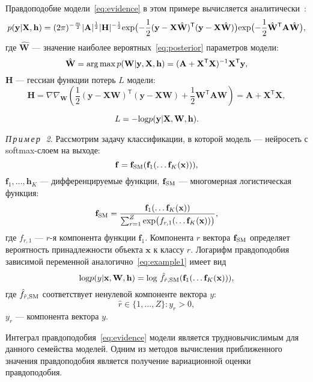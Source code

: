 Правдоподобие модели~\eqref{eq:evidence} в этом примере вычисляется аналитически~\cite{hyperopt}:
\begin{equation}
\label{eq:ground}
	p(\mathbf{y}|\mathbf{X},\mathbf{h})  =  (2\pi) ^{-\frac{m}{2}} |\mathbf{A}|^{\frac{1}{2}} |\mathbf{H}|^{-\frac{1}{2}}  \textnormal{exp}\bigl(-\frac{1}{2}(\mathbf{y} -\mathbf{X} \hat{\mathbf{W}})^\mathsf{T}(\mathbf{y} - \mathbf{X}\hat{\mathbf{W}})\bigr)\textnormal{exp} \bigl(-\frac{1}{2}\hat{\mathbf{W}}^\mathsf{T}\mathbf{A}\hat{\mathbf{W}}\bigr),
\end{equation}
где $\hat{\mathbf{W}}$ --- значение наиболее вероятных~\eqref{eq:posterior} параметров модели:
\[
	\hat{\mathbf{W}} = \operatorname*{arg\,max} p(\mathbf{W}|\mathbf{y}, \mathbf{X}, \mathbf{h}) = (\mathbf{A} + \mathbf{X}^\mathsf{T}\mathbf{X})^{-1}\mathbf{X}^\mathsf{T}\mathbf{y},
\]
$\mathbf{H}$ --- гессиан функции потерь $L$ модели:
\[
	\mathbf{H}	= \nabla \nabla_\mathbf{W} \left(\frac{1}{2} (\mathbf{y} -\mathbf{X} {\mathbf{W}})^\mathsf{T}(\mathbf{y} - \mathbf{X}{\mathbf{W}}) + \frac{1}{2}\mathbf{W}^\mathsf{T}\mathbf{A}\mathbf{W} \right) = \mathbf{A} + \mathbf{X}^\mathsf{T}\mathbf{X},
\]

\[ 
	L = - \textnormal{log} p(\mathbf{y}|  \mathbf{X}, \mathbf{W},\mathbf{h}). 
\]

\textsl{П\,р\,и\,м\,е\,р~\,2.} Рассмотрим задачу классификации, в которой модель --- нейросеть с softmax-слоем на выходе:
\[
\mathbf{f} = \mathbf{f}_\textnormal{SM}(\mathbf{f}_1(\dots \mathbf{f}_K(\mathbf{x}))),
\]
$\mathbf{f}_1, \dots,\mathbf{h}_K$ --- дифференцируемые функции, $\mathbf{f}_\textnormal{SM}$ --- многомерная логистическая функция:
\[
	\mathbf{f}_\textnormal{SM} = \frac{\mathbf{f}_1(\dots \mathbf{f}_K(\mathbf{x}))}{\sum_{r=1}^Z \textnormal{exp}\bigl( {f}_{r,1}(\dots \mathbf{f}_K(\mathbf{x})) \bigr)},
\]
где ${f}_{r,1}$ --- $r$-я компонента функции $\mathbf{f}_1$. Компонента $r$ вектора $\mathbf{f}_\textnormal{SM}$ определяет вероятность принадлежности объекта $\mathbf{x}$ к классу $r$. Логарифм правдоподобия зависимой переменной аналогично~\eqref{eq:example1} имеет вид
\[
	\textnormal{log} p({y}|\mathbf{x}, \mathbf{W},\mathbf{h}) =  \textnormal{log}~\hat{f}_{\hat{r},\textnormal{SM}} (\mathbf{f}_1(\dots \mathbf{f}_K(\mathbf{x}))),
\]
где $\hat{f}_{\hat{r},\textnormal{SM}}$ соответствует ненулевой компоненте вектора ${y}$:
$$\hat{r} \in \{1,\dots,Z\}: y_{r} >0,$$
$y_{r}$ --- компонента вектора ${y}$. 

Интеграл правдоподобия~\eqref{eq:evidence} модели является трудновычислимым для данного семейства моделей. Одним из методов вычисления приближенного значения правдоподобия является получение вариационной оценки правдоподобия.  



